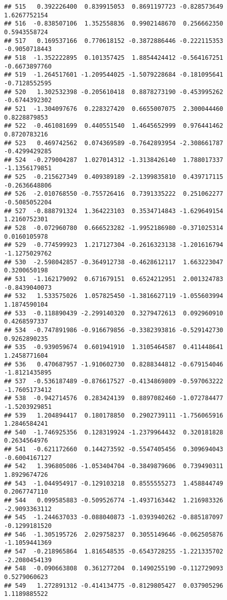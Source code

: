 \documentclass[
]{article}
\begin{document}
\begin{verbatim}
## 515   0.392226400  0.839915053  0.8691197723 -0.828573649  1.6267752154
## 516  -0.838507106  1.352558836  0.9902148670  0.256662350  0.5943558724
## 517   0.169537166  0.770618152 -0.3872886446 -0.222115353 -0.9050718443
## 518  -1.352222895  0.101357425  1.8854424412 -0.564167251 -0.6673897760
## 519  -1.264517601 -1.209544025 -1.5079228684 -0.181095641 -0.7128552595
## 520   1.302532398 -0.205610418  0.8878273190 -0.453995262 -0.6744392302
## 521  -1.304097676  0.228327420  0.6655007075  2.300044460  0.8228879853
## 522  -0.461081699  0.440551540  1.4645652999  0.976441462  0.8720783216
## 523   0.469742562  0.074369589 -0.7642893954 -2.308661787 -0.4299429285
## 524  -0.279004287  1.027014312 -1.3138426140  1.788017337 -1.1356179851
## 525  -0.215627349  0.409389189 -2.1399835810  0.439717115 -0.2636648806
## 526  -2.010768550 -0.755726416  0.7391335222  0.251062277 -0.5085052204
## 527  -0.888791324  1.364223103  0.3534714843 -1.629649154  1.2160752301
## 528  -0.072960780  0.666523282 -1.9952186980 -0.371025314  0.0160105978
## 529  -0.774599923  1.217127304 -0.2616323138 -1.201616794 -1.1275029762
## 530  -2.598042857 -0.364912738 -0.4628612117  1.663223047  0.3200650198
## 531  -1.162179092  0.671679151  0.6524212951  2.001324783 -0.8439040073
## 532   1.533575026  1.057825450 -1.3816627119 -1.055603994  1.1874590104
## 533  -0.118890439 -2.299140320  0.3279472613  0.092960910  0.4268597337
## 534  -0.747891986 -0.916679856 -0.3382393816 -0.529142730  0.9262890235
## 535  -0.939059674  0.601941910  1.3105464587  0.411448641  1.2458771604
## 536   0.470687957 -1.910602730  0.8288344812 -0.679154046 -1.8121435895
## 537  -0.536187489 -0.876617527 -0.4134869809 -0.597063222 -1.7605173412
## 538  -0.942714576  0.283424139  0.8897082460 -1.072784477 -1.5203929851
## 539   1.204894417  0.180178850  0.2902739111 -1.756065916  1.2846584241
## 540  -1.746925356  0.128319924 -1.2379964432  0.320181828  0.2634564976
## 541  -0.621172660  0.144273592 -0.5547405456  0.309694043 -0.6004167127
## 542   1.396805086 -1.053404704 -0.3849879606  0.739490311  1.8929674726
## 543  -1.044954917 -0.129103218  0.8555555273  1.458844749  0.2067747110
## 544   0.099585883 -0.509526774 -1.4937163442  1.216983326 -2.9093363112
## 545  -1.244637033 -0.088040873 -1.0393940262 -0.885187097 -0.1299181520
## 546  -1.305195726  2.029758237  0.3055149646 -0.062505876 -1.1059441369
## 547  -0.218965864  1.816548535 -0.6543728255 -1.221335702 -2.2080454139
## 548  -0.090663808  0.361277204  0.1490255190 -0.112729093  0.5279060623
## 549   1.272891312 -0.414134775 -0.8129805427  0.037905296  1.1189885522

\end{verbatim}
\end{document}
